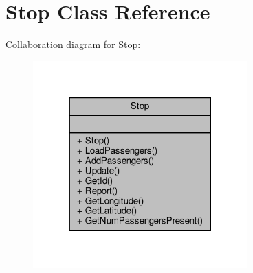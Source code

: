 \hypertarget{classStop}{}\section{Stop Class Reference}
\label{classStop}


Collaboration diagram for Stop\+:
\nopagebreak
\begin{figure}[H]
\begin{center}
\leavevmode
\includegraphics[width=234pt]{classStop__coll__graph}
\end{center}
\end{figure}
